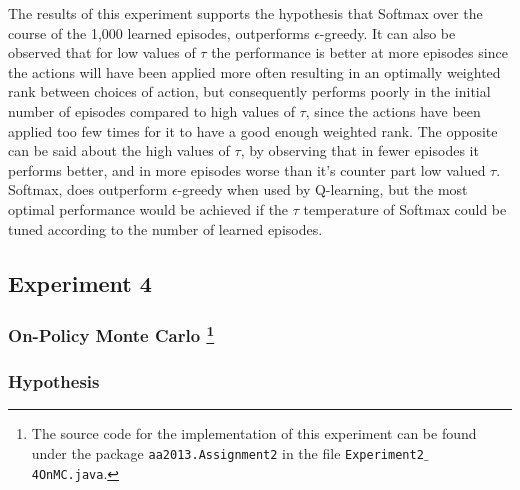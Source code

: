 \documentclass[11pt]{article}
\begin{document}
The results of this experiment supports the hypothesis that Softmax over the course of the 1,000 learned episodes, outperforms $\epsilon$-greedy. It can also be observed that for low values of $\tau$ the performance is better at more episodes since the actions will have been applied more often resulting in an optimally weighted rank between choices of action, but consequently performs poorly in the initial number of episodes compared to high values of $\tau$, since the actions have been applied too few times for it to have a good enough weighted rank. The opposite can be said about the high values of $\tau$, by observing that in fewer episodes it performs better, and in more episodes worse than it's counter part low valued $\tau$.\\
Softmax, does outperform $\epsilon$-greedy when used by Q-learning, but the most optimal performance would be achieved if the $\tau$ temperature of Softmax could be tuned according to the number of learned episodes.




\subsection{Experiment 4}



\subsubsection[title]{On-Policy Monte Carlo \footnote{The source code for the implementation of this experiment can be found under the package \texttt{aa2013.Assignment2} in the file \texttt{Experiment2$\_$4OnMC.java}.}}




\subsubsection{Hypothesis}
\end{document}
